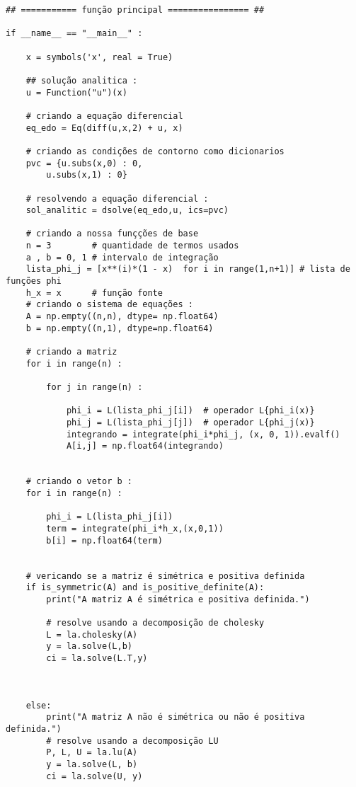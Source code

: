 \documentclass[a4paper, 12pt]{article}
\numberwithin{equation}{section}
\begin{document}
\begin{lstlisting}
## =========== função principal ================ ##  

if __name__ == "__main__" : 
    
    x = symbols('x', real = True)
    
    ## solução analitica : 
    u = Function("u")(x)

    # criando a equação diferencial 
    eq_edo = Eq(diff(u,x,2) + u, x)

    # criando as condições de contorno como dicionarios 
    pvc = {u.subs(x,0) : 0, 
        u.subs(x,1) : 0}

    # resolvendo a equação diferencial :
    sol_analitic = dsolve(eq_edo,u, ics=pvc)
    
    # criando a nossa funçções de base 
    n = 3        # quantidade de termos usados 
    a , b = 0, 1 # intervalo de integração
    lista_phi_j = [x**(i)*(1 - x)  for i in range(1,n+1)] # lista de funções phi 
    h_x = x      # função fonte 
    # criando o sistema de equações :
    A = np.empty((n,n), dtype= np.float64)
    b = np.empty((n,1), dtype=np.float64)
    
    # criando a matriz 
    for i in range(n) : 
        
        for j in range(n) : 
            
            phi_i = L(lista_phi_j[i])  # operador L{phi_i(x)}
            phi_j = L(lista_phi_j[j])  # operador L{phi_j(x)}
            integrando = integrate(phi_i*phi_j, (x, 0, 1)).evalf() 
            A[i,j] = np.float64(integrando)
            
            
    # criando o vetor b : 
    for i in range(n) : 
        
        phi_i = L(lista_phi_j[i])
        term = integrate(phi_i*h_x,(x,0,1))
        b[i] = np.float64(term)
        
        
    # vericando se a matriz é simétrica e positiva definida
    if is_symmetric(A) and is_positive_definite(A):
        print("A matriz A é simétrica e positiva definida.")
        
        # resolve usando a decomposição de cholesky 
        L = la.cholesky(A)
        y = la.solve(L,b)
        ci = la.solve(L.T,y)
        

        
    else:
        print("A matriz A não é simétrica ou não é positiva definida.")
        # resolve usando a decomposição LU
        P, L, U = la.lu(A)
        y = la.solve(L, b)
        ci = la.solve(U, y)
        

\end{lstlisting}
\end{document}
